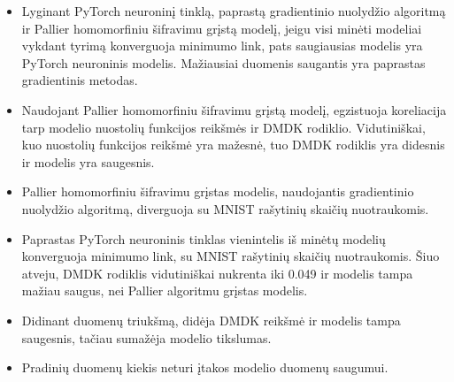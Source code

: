 \documentclass{VUMIFInfBakalaurinis}
\begin{document}
\begin{itemize}
    \item Lyginant PyTorch neuroninį tinklą, paprastą gradientinio nuolydžio algoritmą ir Pallier homomorfiniu šifravimu grįstą modelį, jeigu visi minėti modeliai vykdant tyrimą konverguoja minimumo link, pats saugiausias modelis yra PyTorch neuroninis modelis. Mažiausiai duomenis saugantis yra paprastas gradientinis metodas.
    \item Naudojant Pallier homomorfiniu šifravimu grįstą modelį, egzistuoja koreliacija tarp modelio nuostolių funkcijos reikšmės ir DMDK rodiklio. Vidutiniškai, kuo nuostolių funkcijos reikšmė yra mažesnė, tuo DMDK rodiklis yra didesnis ir modelis yra saugesnis.
    \item Pallier homomorfiniu šifravimu grįstas modelis, naudojantis gradientinio nuolydžio algoritmą, diverguoja su MNIST rašytinių skaičių nuotraukomis.
    \item Paprastas PyTorch neuroninis tinklas vienintelis iš minėtų modelių konverguoja minimumo link, su MNIST rašytinių skaičių nuotraukomis. Šiuo atveju, DMDK rodiklis vidutiniškai nukrenta iki 0.049 ir modelis tampa mažiau saugus, nei Pallier algoritmu grįstas modelis.
    \item Didinant duomenų triukšmą, didėja DMDK reikšmė ir modelis tampa saugesnis, tačiau sumažėja modelio tikslumas.
    \item Pradinių duomenų kiekis neturi įtakos modelio duomenų saugumui.
\end{itemize}
\end{document}
